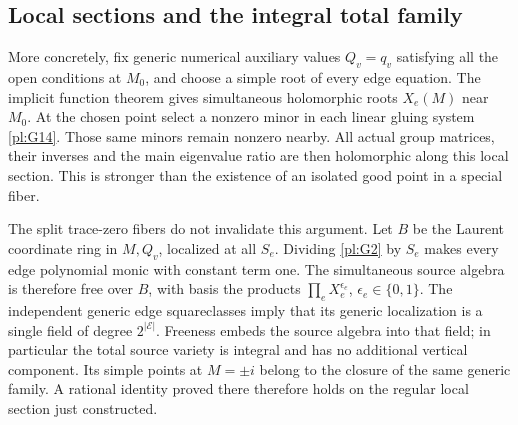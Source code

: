 \subsection{Local sections and the integral total family}\label{pl:local-sections-and-the-integral-total-family}

More concretely, fix generic numerical auxiliary values
\(Q_v=q_v\) satisfying all the open conditions at \(M_0\),
and choose a simple root of every edge equation. The implicit
function theorem gives simultaneous holomorphic roots
\(X_e(M)\) near \(M_0\). At the chosen point select a
nonzero minor in each linear gluing system \eqref{pl:G14}. Those same
minors remain nonzero nearby. All actual group matrices,
their inverses and the main eigenvalue ratio are then
holomorphic along this local section. This is stronger than
the existence of an isolated good point in a special fiber.

The split trace-zero fibers do not invalidate this argument.
Let \(B\) be the Laurent coordinate ring in \(M,Q_v\),
localized at all \(S_e\). Dividing \eqref{pl:G2} by \(S_e\) makes
every edge polynomial monic with constant term one. The
simultaneous source algebra is therefore free over \(B\),
with basis the products \(\prod_e X_e^{\epsilon_e}\),
\(\epsilon_e\in\{0,1\}\). The independent generic edge
squareclasses imply that its generic localization is a
single field of degree \(2^{|\mathcal E|}\). Freeness embeds the
source algebra into that field; in particular the total
source variety is integral and has no additional vertical
component. Its simple points at \(M=\pm i\) belong to
the closure of the same generic family. A rational identity
proved there therefore holds on the regular local section
just constructed.
